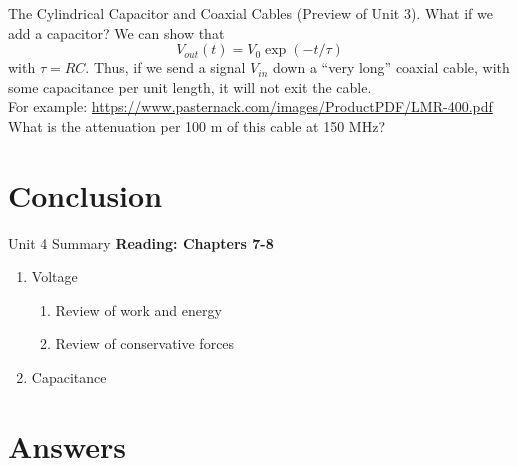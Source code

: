 \documentclass{beamer}
\begin{document}
\begin{frame}{The Cylindrical Capacitor and Coaxial Cables}
(Preview of Unit 3).  What if we add a capacitor?
We can show that
\begin{equation}
V_{out}(t) = V_0 \exp(-t/\tau)
\end{equation}
with $\tau = RC$.  Thus, if we send a signal $V_{in}$ down a ``very long'' coaxial cable, with some capacitance per unit length, it will not exit the cable. \\ \vspace{0.5cm}
For example: \url{https://www.pasternack.com/images/ProductPDF/LMR-400.pdf} \\ \vspace{0.5cm}
What is the attenuation per 100 m of this cable at 150 MHz?
\end{frame}

\section{Conclusion}

\begin{frame}{Unit 4 Summary}
\textbf{Reading: Chapters 7-8}
\begin{enumerate}
\item Voltage
\begin{enumerate}
\item Review of work and energy
\item Review of conservative forces
\end{enumerate}
\item Capacitance
\end{enumerate}
\end{frame}

\section{Answers}
\end{document}

